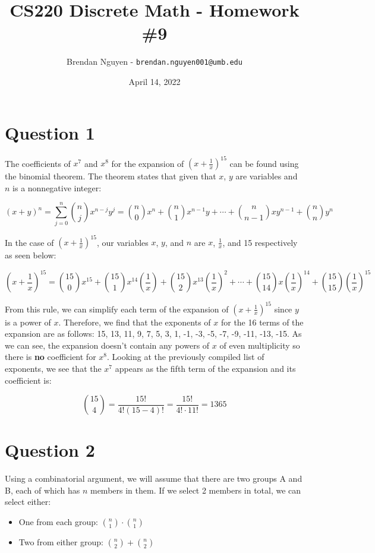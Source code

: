 \documentclass[letterpaper, 12pt]{article}
\title{CS220 Discrete Math - Homework \#9}
\author{Brendan Nguyen - \texttt{brendan.nguyen001@umb.edu}}
\date{April 14, 2022}
\begin{document}
\maketitle

\section*{Question 1}
The coefficients of $x^7$ and $x^8$ for the expansion of $(x + \frac{1}{x})^{15}$ can be found using the binomial theorem. The theorem states that given that $x$, $y$ are variables and $n$ is a nonnegative integer:

\[(x+y)^n = \sum_{j=0}^{n} \binom{n}{j}x^{n-j}y^j = \binom{n}{0}x^n + \binom{n}{1}x^{n-1}y + \cdots + \binom{n}{n-1}xy^{n-1} + \binom{n}{n}y^n\]

In the case of $(x + \frac{1}{x})^{15}$, our variables $x$, $y$, and $n$ are $x$, $\frac{1}{x}$, and 15 respectively as seen below:

\[\left(x+ \frac{1}{x}\right)^{15} = \binom{15}{0}x^{15} + \binom{15}{1}x^{14}\left(\frac{1}{x}\right) + \binom{15}{2}x^{13}\left(\frac{1}{x}\right)^2 + \cdots + \binom{15}{14}x\left(\frac{1}{x}\right)^{14} + \binom{15}{15}\left(\frac{1}{x}\right)^{15}\]

From this rule, we can simplify each term of the expansion of $(x + \frac{1}{x})^{15}$ since $y$ is a power of $x$. Therefore, we find that the exponents of $x$ for the 16 terms of the expansion are as follows: 15, 13, 11, 9, 7, 5, 3, 1, -1, -3, -5, -7, -9, -11, -13, -15. As we can see, the expansion doesn't contain any powers of $x$ of even multiplicity so there is \textbf{no} coefficient for $x^8$. Looking at the previously compiled list of exponents, we see that the $x^7$ appears as the fifth term of the expansion and its coefficient is:

\[\binom{15}{4} = \frac{15!}{4!(15-4)!} = \frac{15!}{4! \cdot 11!} = 1365\]

\section*{Question 2}
Using a combinatorial argument, we will assume that there are two groups A and B, each of which has $n$ members in them. If we select 2 members in total, we can select either:

\begin{itemize}
    \item One from each group: $\binom{n}{1} \cdot \binom{n}{1}$
    \item Two from either group: $\binom{n}{2} + \binom{n}{2}$
\end{itemize}
\end{document}
